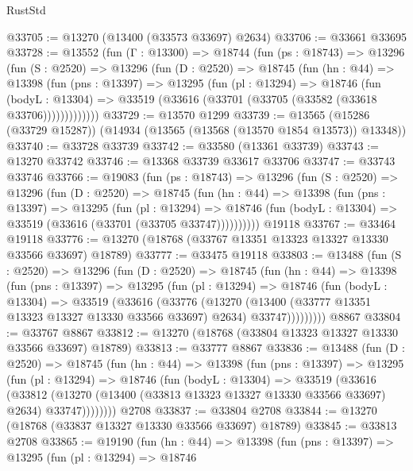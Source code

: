 \begin{lexlean}{RustStd}
\begin{coremodule}
@33705 := @13270 (@13400 (@33573 @33697) @2634)
@33706 := @33661 @33695
@33728 := @13552
    (fun (Γ : @13300) =>
    @18744
      (fun (ps : @18743) =>
      @13296
        (fun (S : @2520) =>
        @13296
          (fun (D : @2520) =>
          @18745
            (fun (hn : @44) =>
            @13398
              (fun (pns : @13397) =>
              @13295
                (fun (pl : @13294) =>
                @18746
                  (fun (bodyL : @13304) =>
                  @33519 (@33616 (@33701 (@33705 (@33582 (@33618 @33706)))))))))))))
@33729 := @13570 @1299
@33739 := @13565 (@15286 (@33729 @15287)) (@14934 (@13565 (@13568 (@13570 @1854 @13573)) @13348))
@33740 := @33728 @33739
@33742 := @33580 (@13361 @33739)
@33743 := @13270 @33742
@33746 := @13368 @33739 @33617 @33706
@33747 := @33743 @33746
@33766 := @19083
    (fun (ps : @18743) =>
    @13296
      (fun (S : @2520) =>
      @13296
        (fun (D : @2520) =>
        @18745
          (fun (hn : @44) =>
          @13398
            (fun (pns : @13397) =>
            @13295
              (fun (pl : @13294) =>
              @18746 (fun (bodyL : @13304) => @33519 (@33616 (@33701 (@33705 @33747))))))))))
    @19118
@33767 := @33464 @19118
@33776 := @13270 (@18768 (@33767 @13351 @13323 @13327 @13330 @33566 @33697) @18789)
@33777 := @33475 @19118
@33803 := @13488
    (fun (S : @2520) =>
    @13296
      (fun (D : @2520) =>
      @18745
        (fun (hn : @44) =>
        @13398
          (fun (pns : @13397) =>
          @13295
            (fun (pl : @13294) =>
            @18746
              (fun (bodyL : @13304) =>
              @33519
                (@33616
                  (@33776
                    (@13270
                      (@13400 (@33777 @13351 @13323 @13327 @13330 @33566 @33697) @2634)
                      @33747)))))))))
    @8867
@33804 := @33767 @8867
@33812 := @13270 (@18768 (@33804 @13323 @13327 @13330 @33566 @33697) @18789)
@33813 := @33777 @8867
@33836 := @13488
    (fun (D : @2520) =>
    @18745
      (fun (hn : @44) =>
      @13398
        (fun (pns : @13397) =>
        @13295
          (fun (pl : @13294) =>
          @18746
            (fun (bodyL : @13304) =>
            @33519
              (@33616
                (@33812
                  (@13270 (@13400 (@33813 @13323 @13327 @13330 @33566 @33697) @2634) @33747))))))))
    @2708
@33837 := @33804 @2708
@33844 := @13270 (@18768 (@33837 @13327 @13330 @33566 @33697) @18789)
@33845 := @33813 @2708
@33865 := @19190
    (fun (hn : @44) =>
    @13398
      (fun (pns : @13397) =>
      @13295
        (fun (pl : @13294) =>
        @18746

\end{coremodule}
\end{lexlean}
